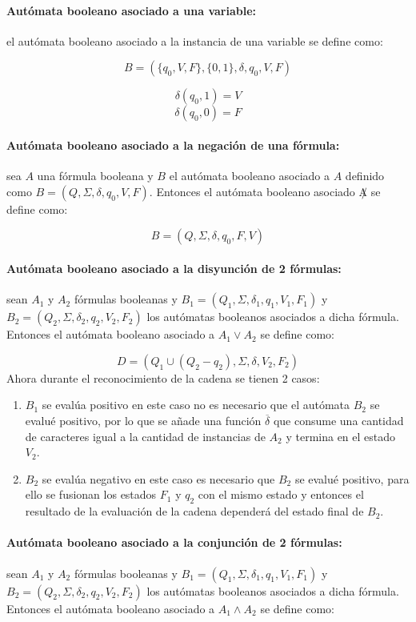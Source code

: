 \documentclass{article}
\begin{document}
\paragraph{Autómata booleano asociado a una variable:} el autómata booleano asociado a la instancia de una variable
se define como:

$$B=(\{q_0,V,F\},\{0,1\},\delta,q_0,V,F)$$

$$\delta(q_0,1)=V$$
$$\delta(q_0,0)=F$$

\paragraph{Autómata booleano asociado a la negación de una fórmula:} sea $A$ una fórmula booleana y $B$ el autómata booleano asociado a $A$ definido
como $B=(Q,\Sigma,\delta,q_0,V,F)$. Entonces el autómata booleano asociado $\not A$ se define como:

$$B=(Q,\Sigma,\delta,q_0,F,V)$$

\paragraph{Autómata booleano asociado a la disyunción de 2 fórmulas:} sean $A_1$ y $A_2$ fórmulas booleanas y
$B_1=(Q_1,\Sigma,\delta_1,q_1,V_1,F_1)$ y $B_2=(Q_2,\Sigma,\delta_2,q_2,V_2,F_2)$ los autómatas booleanos asociados a dicha fórmula. Entonces el autómata booleano asociado a
$A_1 \vee A_2$ se define como:

$$
      D=(Q_1\cup (Q_2-q_2),\Sigma,\delta,V_2, F_2)
$$
Ahora durante el reconocimiento de la cadena se tienen 2 casos:

\begin{enumerate}
      \item $B_1$ se evalúa positivo en este caso no es necesario que el autómata $B_2$ se evalué positivo, por lo
            que se añade una función $\overline{\delta}$ que consume una cantidad de caracteres igual a la cantidad
            de instancias de $A_2$ y termina en el estado $V_2$.
      \item $B_2$ se evalúa negativo en este caso es necesario que $B_2$ se evalué positivo, para ello se fusionan
            los estados $F_1$ y $q_2$ con el mismo estado y entonces el resultado de la evaluación de la cadena dependerá
            del estado final de $B_2$.
\end{enumerate}

\paragraph{Autómata booleano asociado a la conjunción de 2 fórmulas:} sean $A_1$ y $A_2$ fórmulas booleanas y
$B_1=(Q_1,\Sigma,\delta_1,q_1,V_1,F_1)$ y $B_2=(Q_2,\Sigma,\delta_2,q_2,V_2,F_2)$ los autómatas booleanos asociados a dicha fórmula. Entonces el autómata booleano asociado a
$A_1 \wedge A_2$ se define como:
\end{document}
